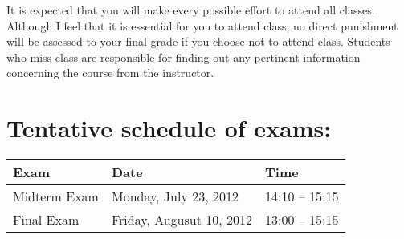 \documentclass[11pt]{article}
\begin{document}
It is expected that you will make every possible effort to attend all classes. Although I feel that it is essential for you to attend class, no direct punishment will be assessed to your final grade if you choose not to attend class. Students who miss class are responsible for finding out any pertinent information concerning the course from the instructor. 
\section*{Tentative schedule of exams:}
\label{sec-8}


\begin{center}
\begin{tabular}{lll}
\hline
 Exam          &  Date                      &  Time           \\
\hline
 Midterm Exam  &  Monday, July 23, 2012     &  14:10 – 15:15  \\
 Final Exam    &  Friday, Augusut 10, 2012  &  13:00 – 15:15  \\
\hline
\end{tabular}
\end{center}
\end{document}
